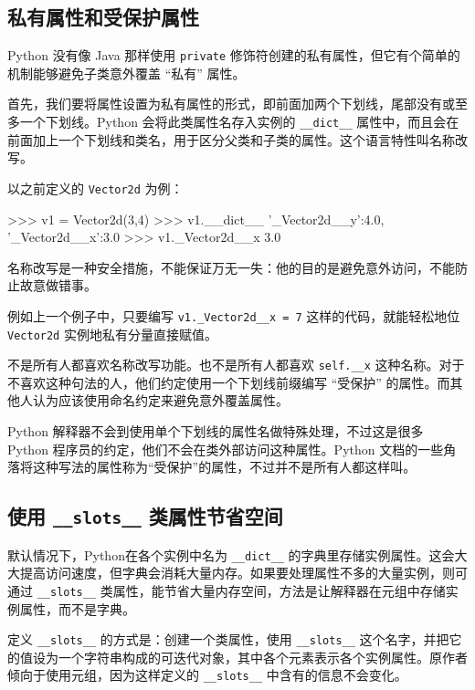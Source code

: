 \subsection{私有属性和受保护属性}

Python 没有像 Java 那样使用 \texttt{private} 修饰符创建的私有属性，但它有个简单的机制能够避免子类意外覆盖 ``私有'' 属性。

首先，我们要将属性设置为私有属性的形式，即前面加两个下划线，尾部没有或至多一个下划线。Python 会将此类属性名存入实例的 \texttt{\_\_dict\_\_} 属性中，而且会在前面加上一个下划线和类名，用于区分父类和子类的属性。这个语言特性叫名称改写。

以之前定义的 \texttt{Vector2d} 为例：

\begin{python}
>>> v1 = Vector2d(3,4)
>>> v1.__dict__
{'_Vector2d__y':4.0, '_Vector2d__x':3.0}
>>> v1._Vector2d__x
3.0
\end{python}

名称改写是一种安全措施，不能保证万无一失：他的目的是避免意外访问，不能防止故意做错事。

例如上一个例子中，只要编写 \texttt{v1.\_Vector2d\_\_x = 7} 这样的代码，就能轻松地位 \texttt{Vector2d} 实例地私有分量直接赋值。

不是所有人都喜欢名称改写功能。也不是所有人都喜欢 \texttt{self.\_\_x} 这种名称。对于不喜欢这种句法的人，他们约定使用一个下划线前缀编写 ``受保护'' 的属性。而其他人认为应该使用命名约定来避免意外覆盖属性。

Python 解释器不会到使用单个下划线的属性名做特殊处理，不过这是很多 Python 程序员的约定，他们不会在类外部访问这种属性。Python 文档的一些角落将这种写法的属性称为``受保护''的属性，不过并不是所有人都这样叫。

\subsection{使用 \texttt{\_\_slots\_\_} 类属性节省空间}

默认情况下，Python在各个实例中名为 \texttt{\_\_dict\_\_} 的字典里存储实例属性。这会大大提高访问速度，但字典会消耗大量内存。如果要处理属性不多的大量实例，则可通过 \texttt{\_\_slots\_\_} 类属性，能节省大量内存空间，方法是让解释器在元组中存储实例属性，而不是字典。

定义 \texttt{\_\_slots\_\_} 的方式是：创建一个类属性，使用 \texttt{\_\_slots\_\_} 这个名字，并把它的值设为一个字符串构成的可迭代对象，其中各个元素表示各个实例属性。原作者倾向于使用元组，因为这样定义的 \texttt{\_\_slots\_\_} 中含有的信息不会变化。

